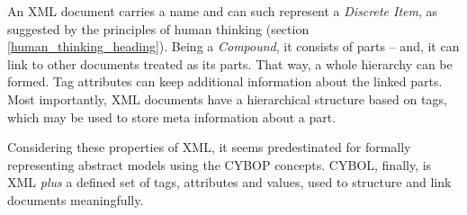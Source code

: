 An XML document carries a name and can such represent a \emph{Discrete Item},
as suggested by the principles of human thinking (section
\ref{human_thinking_heading}). Being a \emph{Compound}, it consists of parts --
and, it can link to other documents treated as its parts. That way, a whole
hierarchy can be formed. Tag attributes can keep additional information about
the linked parts. Most importantly, XML documents have a hierarchical structure
based on tags, which may be used to store meta information about a part.

Considering these properties of XML, it seems predestinated for formally
representing abstract models using the CYBOP concepts. CYBOL, finally, is XML
\emph{plus} a defined set of tags, attributes and values, used to structure and
link documents meaningfully.
